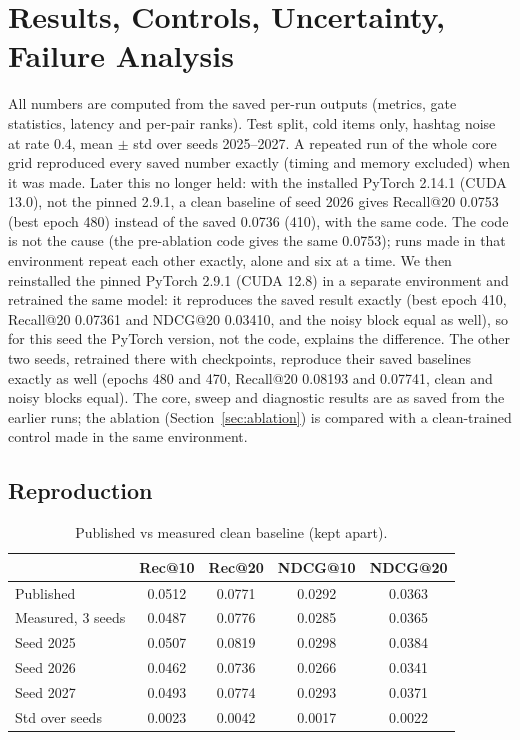 \documentclass[conference]{IEEEtran}
\begin{document}
\section{Results, Controls, Uncertainty, Failure Analysis}
\label{sec:results}

All numbers are computed from the saved per-run outputs (metrics, gate statistics, latency and per-pair ranks). Test split, cold items only, hashtag noise at rate 0.4, mean $\pm$ std over seeds 2025--2027. A repeated run of the whole core grid reproduced every saved number exactly (timing and memory excluded) when it was made. Later this no longer held: with the installed PyTorch 2.14.1 (CUDA 13.0), not the pinned 2.9.1, a clean baseline of seed 2026 gives Recall@20 0.0753 (best epoch 480) instead of the saved 0.0736 (410), with the same code. The code is not the cause (the pre-ablation code gives the same 0.0753); runs made in that environment repeat each other exactly, alone and six at a time. We then reinstalled the pinned PyTorch 2.9.1 (CUDA 12.8) in a separate environment and retrained the same model: it reproduces the saved result exactly (best epoch 410, Recall@20 0.07361 and NDCG@20 0.03410, and the noisy block equal as well), so for this seed the PyTorch version, not the code, explains the difference. The other two seeds, retrained there with checkpoints, reproduce their saved baselines exactly as well (epochs 480 and 470, Recall@20 0.08193 and 0.07741, clean and noisy blocks equal). The core, sweep and diagnostic results are as saved from the earlier runs; the ablation (Section~\ref{sec:ablation}) is compared with a clean-trained control made in the same environment.

\subsection{Reproduction}

\begin{table}[!t]
\centering\footnotesize
\caption{Published vs measured clean baseline (kept apart).}
\label{tab:repro}
\begin{tabular}{@{}lcccc@{}}
\toprule
 & Rec@10 & Rec@20 & NDCG@10 & NDCG@20 \\
\midrule
Published & 0.0512 & 0.0771 & 0.0292 & 0.0363 \\
Measured, 3 seeds & 0.0487 & 0.0776 & 0.0285 & 0.0365 \\
\midrule
Seed 2025 & 0.0507 & 0.0819 & 0.0298 & 0.0384 \\
Seed 2026 & 0.0462 & 0.0736 & 0.0266 & 0.0341 \\
Seed 2027 & 0.0493 & 0.0774 & 0.0293 & 0.0371 \\
Std over seeds & 0.0023 & 0.0042 & 0.0017 & 0.0022 \\
\bottomrule
\end{tabular}
\end{table}
\end{document}
